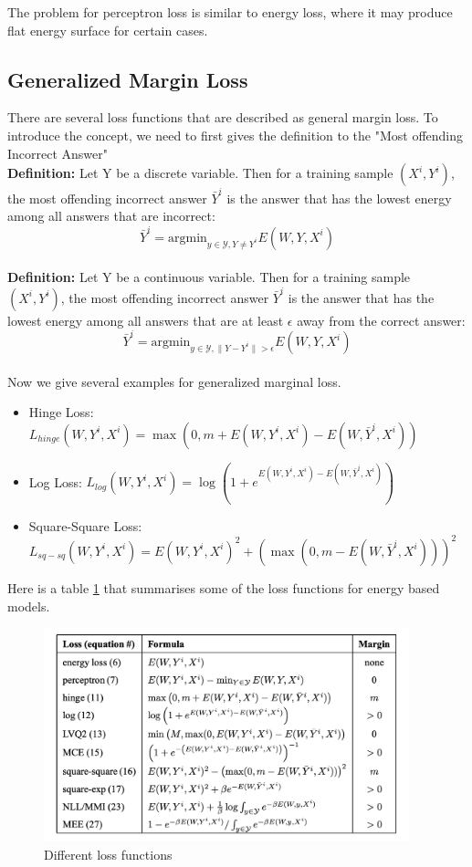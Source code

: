 The problem for perceptron loss is similar to energy loss,
where it may produce flat energy surface for certain cases.

\subsection{Generalized Margin Loss}

There are several loss functions that are described as general margin loss.
To introduce the concept, we need to first gives the definition 
to the "Most offending Incorrect Answer"\\

\textbf{Definition: } Let Y be a discrete variable. Then for a training sample $(X^i, Y^i)$,
the most offending incorrect answer $\bar{Y}^i$
is the answer that has the lowest energy among all answers that are incorrect:
\[
    \bar{Y}^i = \text{argmin}_{y \in \mathcal{Y}, Y \neq Y^i}
    E(W, Y, X^i)
\]
\\
\textbf{Definition: } Let Y be a continuous variable. 
Then for a training sample $(X^i, Y^i)$,
the most offending incorrect answer $\bar{Y}^i$
is the answer that has the lowest energy among all answers
that are at least $\epsilon$ away from the correct answer:
\[
    \bar{Y}^i = \text{argmin}_{y \in \mathcal{Y}, \parallel	Y-Y^i\parallel > \epsilon}
    E(W, Y, X^i)
\]
\\
Now we give several examples for generalized marginal loss.
\begin{itemize}
    \item Hinge Loss: 
    $L_{hinge}(W, Y^i, X^i) = \max(0, m + E(W, Y^i, X^i) - E(W, \bar{Y}^i, X^i))$
    \item Log Loss:
    $L_{log}(W, Y^i, X^i) = \log(1 + e^{E(W, Y^i, X^i) - E(W, \bar{Y}^i, X^i)})$
    \item Square-Square Loss:
    $L_{sq-sq}(W, Y^i, X^i) = E(W, Y^i, X^i)^2 + (\max(0, m - E(W, \bar{Y}^i, X^i)))^2$

\end{itemize}

Here is a table \cref{fig:energy_based_models_loss_functions} that summarises some of the loss functions for energy based models.
\begin{figure}[h!]
    \centering
    \includegraphics[width=300pt]{figs/loss_zoo.png}
    \caption{Different loss functions}
    \label{fig:energy_based_models_loss_functions}
\end{figure}









